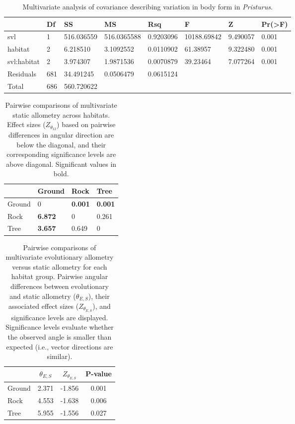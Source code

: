 \documentclass[
  11pt,
]{article}
\begin{document}
\newpage

\begin{table}[H]

\caption{\label{tab:unnamed-chunk-1}Multivariate analysis of covariance describing variation in body form in \textit{Pristurus}.}
\centering
\begin{tabular}[t]{llllllll}
\toprule
  & Df & SS & MS & Rsq & F & Z & Pr(>F)\\
\midrule
svl & 1 & 516.036559 & 516.0365588 & 0.9203096 & 10188.69842 & 9.490057 & 0.001\\
habitat & 2 & 6.218510 & 3.1092552 & 0.0110902 & 61.38957 & 9.322480 & 0.001\\
svl:habitat & 2 & 3.974307 & 1.9871536 & 0.0070879 & 39.23464 & 7.077264 & 0.001\\
Residuals & 681 & 34.491245 & 0.0506479 & 0.0615124 &  &  & \\
Total & 686 & 560.720622 &  &  &  &  & \\
\bottomrule
\end{tabular}
\end{table}

\newpage

\begin{table}[H]

\caption{\label{tab:unnamed-chunk-2}Pairwise comparisons of multivariate static allometry across habitats. Effect sizes ($Z_{\theta_{12}}$) based on pairwise differences in angular direction are below the diagonal, and their corresponding significance levels are above diagonal. Significant values in bold.}
\centering
\begin{tabular}[t]{llll}
\toprule
  & Ground & Rock & Tree\\
\midrule
Ground & 0 & \textbf{0.001} & \textbf{0.001}\\
Rock & \textbf{6.872} & 0 & 0.261\\
Tree & \textbf{3.657} & 0.649 & 0\\
\bottomrule
\end{tabular}
\end{table}

\newpage

\begin{table}[H]

\caption{\label{tab:unnamed-chunk-3}Pairwise comparisons of multivariate evolutionary allometry versus static allometry for each habitat group. Pairwise angular differences between evolutionary and static allometry ($\theta_{E,S}$), their associated effect sizes ($Z_{\theta_{E,S}}$), and significance levels are displayed. Significance levels evaluate whether the observed angle is smaller than expected (i.e., vector directions are similar).}
\centering
\begin{tabular}[t]{lccc}
\toprule
  & $\theta_{E,S}$ & $Z_{\theta_{E,S}}$ & P-value\\
\midrule
Ground & 2.371 & -1.856 & 0.001\\
Rock & 4.553 & -1.638 & 0.006\\
Tree & 5.955 & -1.556 & 0.027\\
\bottomrule
\end{tabular}
\end{table}
\end{document}
